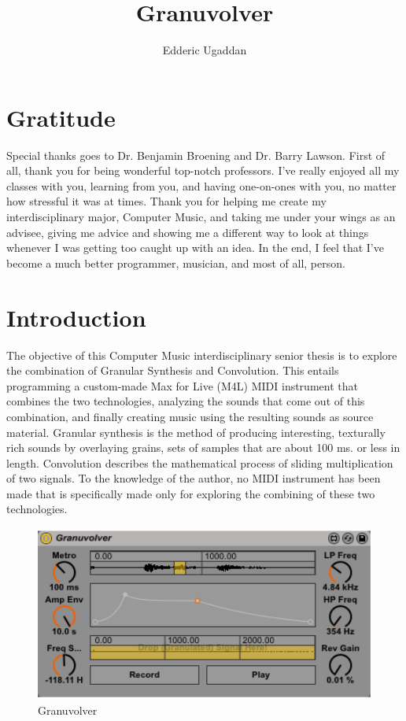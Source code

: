 \documentclass{article}
\author{Edderic Ugaddan}
\title{Granuvolver}
\begin{document}
	\maketitle
	\tableofcontents
	\section{Gratitude}

		Special thanks goes to Dr. Benjamin Broening and Dr. Barry Lawson. First of all, thank you for being wonderful top-notch professors. I've really enjoyed all my classes with you, learning from you, and having one-on-ones with you, no matter how stressful it was at times. Thank you for helping me create my interdisciplinary major, Computer Music, and taking me under your wings as an advisee, giving me advice and showing me a different way to look at things whenever I was getting too caught up with an idea.  In the end, I feel that I've become a much better programmer, musician, and most of all, person.

	\section{Introduction}

		The objective of this Computer Music interdisciplinary senior thesis is to explore the combination of Granular Synthesis and Convolution. This entails programming a custom-made Max for Live (M4L) MIDI instrument that combines the two technologies, analyzing the sounds that come out of this combination, and finally creating music using the resulting sounds as source material. Granular synthesis is the method of producing interesting, texturally rich sounds by overlaying grains, sets of samples that are about 100 ms. or less in length. Convolution describes the mathematical process of sliding multiplication of two signals.   To the knowledge of the author, no MIDI instrument has been made that is specifically made only for exploring the combining of these two technologies.

		\begin{figure}[h!]
		  \centering
		  \includegraphics[width=1\textwidth]{images/Granuvolver}
		  \caption{Granuvolver}
		\end{figure}
\end{document}
